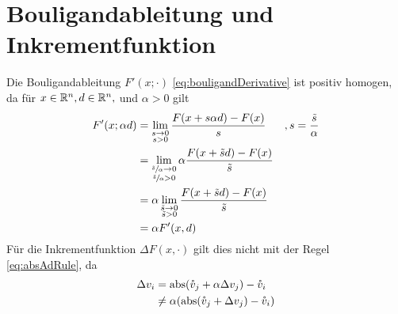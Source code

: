 \section{Bouligandableitung und Inkrementfunktion}\label{sec:bouligandAndIncrement}
 Die Bouligandableitung $F'(x;\cdot)$ \eqref{eq:bouligandDerivative} ist positiv homogen, da für $x\in \mathbb{R}^n, d\in \mathbb{R}^n,$ und $\alpha>0$ gilt
 \[
 \begin{aligned}
  F'(x;\alpha d) &=  \lim_{\substack{s\to 0 \\ s>0}} \frac{F(x+s\alpha d)-F(x)}{s} &,s = \frac{\tilde s}{\alpha} \\
			 &=  \lim_{\substack{\sfrac{\tilde s}{\alpha}\to 0 \\ \sfrac{\tilde s}{\alpha}>0}} \alpha \frac{F(x+\tilde s d)-F(x)}{\tilde s} \\
			 &= \alpha \lim_{\substack{\tilde s\to 0 \\ \tilde s>0}} \frac{F(x+\tilde s d)-F(x)}{\tilde s} \\
			 &= \alpha  F'(x, d) 
 \end{aligned}
 \]
Für die Inkrementfunktion $\Delta F(x,\cdot)$ gilt dies nicht mit der Regel \ref{eq:absAdRule}, da 
\[
\begin{aligned}
 \Delta v_i &= \operatorname{abs}(\mathring{v}_j+ \alpha \Delta v_j) - \mathring{v}_i \\
 &\neq \alpha (\operatorname{abs}(\mathring{v}_j+ \Delta v_j) - \mathring{v}_i) \\
 \end{aligned}
\]

% 
